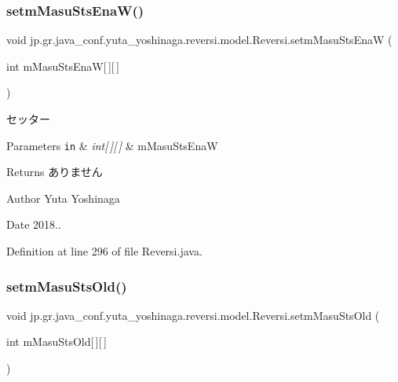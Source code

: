 \subsubsection{\texorpdfstring{setm\+Masu\+Sts\+Ena\+W()}{setmMasuStsEnaW()}}
{\footnotesize\ttfamily void jp.\+gr.\+java\+\_\+conf.\+yuta\+\_\+yoshinaga.\+reversi.\+model.\+Reversi.\+setm\+Masu\+Sts\+EnaW (\begin{DoxyParamCaption}\item[{int}]{m\+Masu\+Sts\+EnaW\mbox{[}$\,$\mbox{]}\mbox{[}$\,$\mbox{]} }\end{DoxyParamCaption})}



セッター 


\begin{DoxyParams}[1]{Parameters}
\mbox{\tt in}  & {\em int\mbox{[}$\,$\mbox{]}\mbox{[}$\,$\mbox{]}} & m\+Masu\+Sts\+EnaW \\
\hline
\end{DoxyParams}
\begin{DoxyReturn}{Returns}
ありません 
\end{DoxyReturn}
\begin{DoxyAuthor}{Author}
Yuta Yoshinaga 
\end{DoxyAuthor}
\begin{DoxyDate}{Date}
2018.. 
\end{DoxyDate}


Definition at line 296 of file Reversi.\+java.

\mbox{\label{classjp_1_1gr_1_1java__conf_1_1yuta__yoshinaga_1_1reversi_1_1model_1_1_reversi_aadea9ebffe1ab20a3f0ef4d348d0dba3}} 
\subsubsection{\texorpdfstring{setm\+Masu\+Sts\+Old()}{setmMasuStsOld()}}
{\footnotesize\ttfamily void jp.\+gr.\+java\+\_\+conf.\+yuta\+\_\+yoshinaga.\+reversi.\+model.\+Reversi.\+setm\+Masu\+Sts\+Old (\begin{DoxyParamCaption}\item[{int}]{m\+Masu\+Sts\+Old\mbox{[}$\,$\mbox{]}\mbox{[}$\,$\mbox{]} }\end{DoxyParamCaption})}



